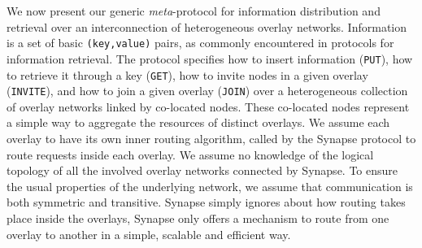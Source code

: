 %
We now present our generic \emph{meta}-protocol for information
distribution and retrieval over an interconnection of heterogeneous
overlay networks. Information is a set of basic {\tt (key,value)}
pairs, as commonly encountered in protocols for information retrieval.
The protocol specifies how to insert information ({\tt PUT}), how to
retrieve it through a key ({\tt GET}), how to invite nodes in a given
overlay ({\tt INVITE}), and how to join a given overlay ({\tt JOIN})
over a heterogeneous collection of overlay networks linked by
co-located nodes. These co-located nodes represent a simple way to
aggregate the resources of distinct overlays. We assume each overlay
to have its own inner routing algorithm, called by the Synapse
protocol to route requests inside each overlay. We assume no knowledge
of the logical topology of all the involved overlay networks
connected by Synapse. To ensure the usual properties of the underlying
network, we assume that communication is both symmetric and
transitive. Synapse simply ignores about how routing takes place
inside the overlays, Synapse only offers a mechanism to route from one
overlay to another in a simple, scalable and efficient way.

